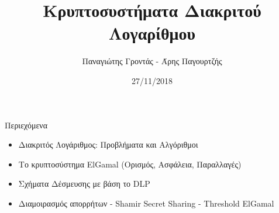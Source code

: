 \documentclass[handout]{beamer}
\title{Κρυπτοσυστήματα Διακριτού Λογαρίθμου}
\author{Παναγιώτης Γροντάς - Άρης Παγουρτζής}
\date{27/11/2018}
\institute{ΕΜΠ - Κρυπτογραφία (2018-2019)}
\begin{document}
\setlength{\columnseprule}{0.4pt}

\newcommand{\xor}{ \oplus }
\newcommand{\MSG}{ \mathtt{M} }
\newcommand{\KEY}{ \mathtt{K} }
\newcommand{\CPH}{ \mathtt{C} }
\newcommand{\keygen}{\mathtt{KeyGen}}
\newcommand{\enc}{\mathtt{Encrypt}}
\newcommand{\dec}{\mathtt{Decrypt}}
\newcommand{\adv}{$\mathcal{A}$ }
\newcommand{\advb}{$\mathcal{B} \,$ }
\newcommand{\chal}{$\mathcal{C} \,$ }
\newcommand{\hash}{$\mathcal{H} \,$ }
\newcommand{\cs}{$\mathcal{CS} \,$ }
\newcommand{\zns}{  \mathbb{Z}^*_n }
\newcommand{\zn}[1]{  \mathbb{Z}^*_#1 }

\newcommand{\green}[1]{\textcolor{teal}{#1}}
\newcommand{\Green}[1]{\textcolor{Teal}{#1}}
\newcommand{\ForestGreen}[1]{\textcolor{ForestGreen}{#1}}
\newcommand{\blue}[1]{\textcolor{blue}{#1}}
\newcommand{\magenta}[1]{\textcolor{magenta}{#1}}
\newcommand{\cyan}[1]{\textcolor{cyan}{#1}}

\newcommand{\twopartdef}[4]
{ 
		\begin{cases}
			#1 , #2 \\
			#3 , #4
		\end{cases} 
}

\npthousandsep{ }
\begin{frame}
\titlepage
\end{frame}



\begin{frame}{Περιεχόμενα}
\begin{itemize}
\item Διακριτός Λογάριθμος: Προβλήματα και Αλγόριθμοι
\item Το κρυπτοσύστημα ElGamal (Ορισμός, Ασφάλεια, Παραλλαγές)
\item Σχήματα Δέσμευσης με βάση το DLP
\item Διαμοιρασμός απορρήτων - Shamir Secret Sharing - Threshold ElGamal
\end{itemize}
\end{frame}
\end{document}
